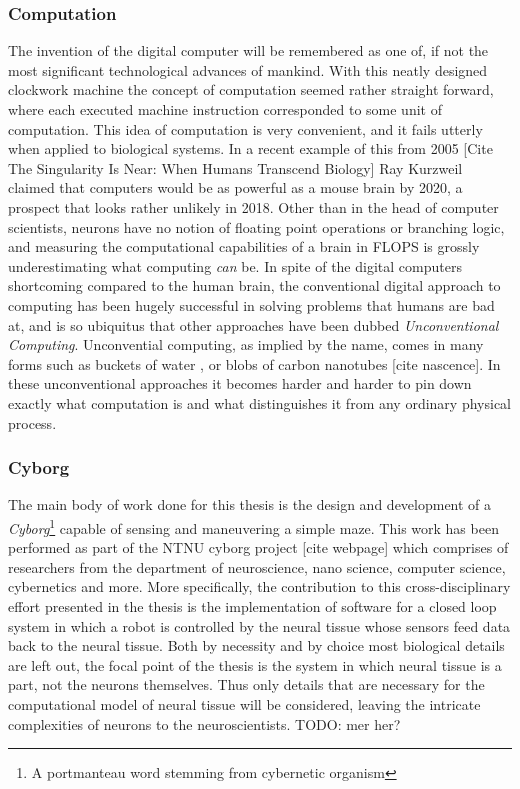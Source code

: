 \subsubsection{Computation}
The invention of the digital computer will be remembered as one of, if not the
most significant technological advances of mankind.
%
With this neatly designed clockwork machine the concept of computation seemed
rather straight forward, where each executed machine instruction corresponded to
some unit of computation.
%
This idea of computation is very convenient, and it fails utterly when
applied to biological systems.
In a recent example of this from 2005 [Cite The Singularity Is Near: When Humans
Transcend Biology] Ray Kurzweil claimed that computers would be as powerful as a
mouse brain by 2020, a prospect that looks rather unlikely in 2018.
Other than in the head of computer scientists, neurons have no notion of
floating point operations or branching logic, and measuring the computational
capabilities of a brain in FLOPS is grossly underestimating what computing
\emph{can} be.
%
In spite of the digital computers shortcoming compared to the human brain, the
conventional digital approach to computing has been hugely successful in solving
problems that humans are bad at, and is so ubiquitus that other approaches
have been dubbed \emph{Unconventional Computing}.
%
Unconvential computing, as implied by the name, comes in many forms such as
buckets of water \cite{fernando_pattern_2003}, or blobs of carbon nanotubes
[cite nascence]. 
%
In these unconventional approaches it becomes harder and harder to pin down
exactly what computation is and what distinguishes it from any ordinary physical
process.
%
\subsubsection{Cyborg}
The main body of work done for this thesis is the design and development of a
\emph{Cyborg}\footnote{A portmanteau word stemming from cybernetic organism}
capable of sensing and maneuvering a simple maze.
This work has been performed as part of the NTNU cyborg project [cite webpage]
which comprises of researchers from the department of neuroscience, nano
science, computer science, cybernetics and more.
More specifically, the contribution to this cross-disciplinary effort presented
in the thesis is the implementation of software for a closed loop system in which a
robot is controlled by the neural tissue whose sensors feed data back to the neural
tissue.
Both by necessity and by choice most biological details are left out, the focal
point of the thesis is the system in which neural tissue is a part, not the
neurons themselves.
Thus only details that are necessary for the computational model of neural
tissue will be considered, leaving the intricate complexities of neurons to the
neuroscientists.
TODO: mer her?
\cleardoublepage


